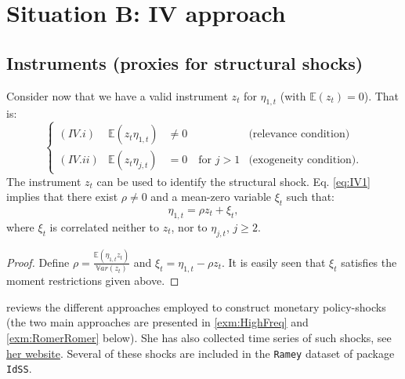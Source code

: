 \documentclass[
  12pt,
]{book}
\theoremstyle{definition}
\theoremstyle{definition}
\theoremstyle{definition}
\theoremstyle{definition}
\theoremstyle{remark}
\begin{document}
\section{Situation B: IV approach}\label{situation-b-iv-approach}

\subsection{Instruments (proxies for structural shocks)}\label{instruments-proxies-for-structural-shocks}

Consider now that we have a valid instrument \(z_t\) for \(\eta_{1,t}\) (with \(\mathbb{E}(z_t)=0\)). That is:
\begin{equation}
\left\{
\begin{array}{llll}
(IV.i) & \mathbb{E}(z_t \eta_{1,t}) &\ne 0 & \mbox{(relevance condition)} \\
(IV.ii) & \mathbb{E}(z_t \eta_{j,t}) &= 0 \quad \mbox{for } j>1 & \mbox{(exogeneity condition).}
\end{array}\right.\label{eq:IV1}
\end{equation}
The instrument \(z_t\) can be used to identify the structural shock. Eq. \eqref{eq:IV1} implies that there exist \(\rho \ne 0\) and a mean-zero variable \(\xi_t\) such that:
\[
\eta_{1,t} = \rho z_t + \xi_t,
\]
where \(\xi_t\) is correlated neither to \(z_t\), nor to \(\eta_{j,t}\), \(j\ge2\).

\begin{proof}
Define \(\rho = \frac{\mathbb{E}(\eta_{1,t}z_t)}{\mathbb{V}ar(z_t)}\) and \(\xi_t = \eta_{1,t} - \rho z_t\). It is easily seen that \(\xi_t\) satisfies the moment restrictions given above.
\end{proof}

\citet{Ramey_2016_NBER} reviews the different approaches employed to construct monetary policy-shocks (the two main approaches are presented in \ref{exm:HighFreq} and \ref{exm:RomerRomer} below). She has also collected time series of such shocks, see \href{https://econweb.ucsd.edu/~vramey/research.html\#mon}{her website}. Several of these shocks are included in the \texttt{Ramey} dataset of package \texttt{IdSS}.
\end{document}
